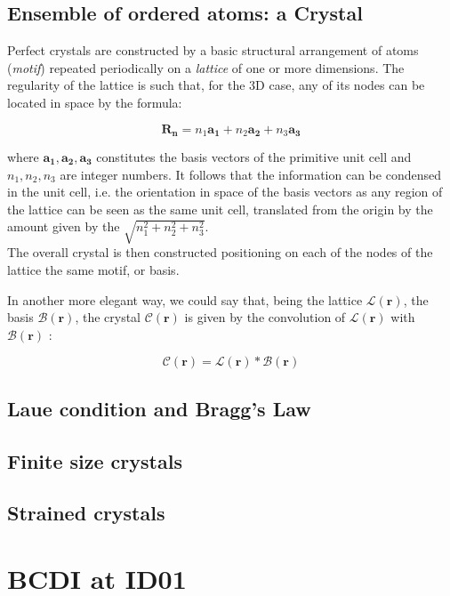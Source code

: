 \subsection{Ensemble of ordered atoms: a Crystal}

Perfect crystals are constructed by a basic structural arrangement of atoms (\textit{motif}) repeated periodically on a 
\textit{lattice} of one or more dimensions. The regularity of the lattice is such that, for the 3D case, any of its nodes 
can be located in space by the formula: 

\begin{equation}
   \mathbf {R_n} = n_1\mathbf{a_1} + n_2\mathbf{a_2} + n_3\mathbf{a_3}
   \label{eq:lattice}
\end{equation}

where ${\mathbf{a_1},\mathbf{a_2},\mathbf{a_3}}$ constitutes the basis vectors of the primitive unit cell and $n_1, n_2, n_3$ are integer numbers. 
It follows that the information can be condensed in the unit cell, i.e. the orientation in space of the basis vectors as any region 
of the lattice can be seen as the same unit cell, translated from the origin by the amount given by the $\sqrt{n_1^2 + n_2^2 + n_3^2}$. \\

The overall crystal is then constructed positioning on each of the nodes of the lattice the same motif, or basis. 

In another more elegant way, we could say that, being the lattice $\mathcal{L}(\mathbf r)$, the basis $\mathcal{B}(\mathbf r)$, the crystal 
$\mathcal{C}(\mathbf r)$ is given by the convolution of $\mathcal{L}(\mathbf r)$ with $\mathcal{B}(\mathbf r)$ : 

\begin{equation}
    \mathcal{C}(\mathbf r)  = \mathcal{L}(\mathbf r) \ast  \mathcal{B}(\mathbf r)
    \label{eq:conv}
 \end{equation}




\subsection{Laue condition and Bragg's Law} 
\subsection{Finite size crystals}
\subsection{Strained crystals}

\section{BCDI at ID01}\label{chp:phasing}
